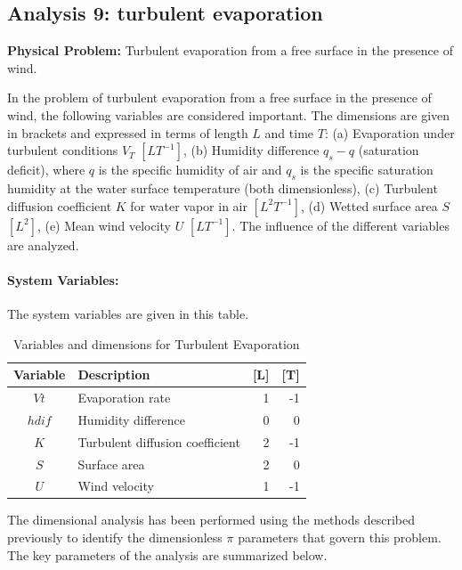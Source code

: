 \subsection{Analysis 9: turbulent evaporation}
\label{sec:Turbulent_Evaporation}

\begin{problembox}
\textbf{Physical Problem:} Turbulent evaporation from a free surface in the presence of wind.
\end{problembox}
\begin{codebox}
In the problem of turbulent evaporation from a free surface in the presence of wind, the following variables are considered important. The dimensions are given in brackets and expressed in terms of length $L$ and time $T$: (a) Evaporation under turbulent conditions $V_T$ $[LT^{-1}]$,  (b) Humidity difference $q_s-q$ (saturation deficit), where $q$ is the specific humidity of air and $q_s$ is the specific saturation humidity at the water surface temperature (both dimensionless), (c) Turbulent diffusion coefficient $K$ for water vapor in air $[L^2T^{-1}]$, (d) Wetted surface area $S$ $[L^2]$, (e) Mean wind velocity $U$ $[LT^{-1}]$. The influence of the different variables are analyzed.
\end{codebox}

\paragraph{System Variables: } The system variables are given in this table.

\begin{table}[htpb]
\centering
\begin{tabular}{|c|l|r|r|}
\hline
\textbf{Variable} & \textbf{Description} & \textbf{[L]} & \textbf{[T]} \\
\hline
$Vt$ & Evaporation rate & 1 & -1 \\
$hdif$ & Humidity difference & 0 & 0 \\
$K$ & Turbulent diffusion coefficient & 2 & -1 \\
$S$ & Surface area & 2 & 0 \\
$U$ & Wind velocity & 1 & -1 \\
\hline
\end{tabular}
\caption{Variables and dimensions for Turbulent Evaporation}
\end{table}

The dimensional analysis has been performed using the methods described previously to identify the dimensionless $\pi$ parameters that govern this problem. The key parameters of the analysis are summarized below.

